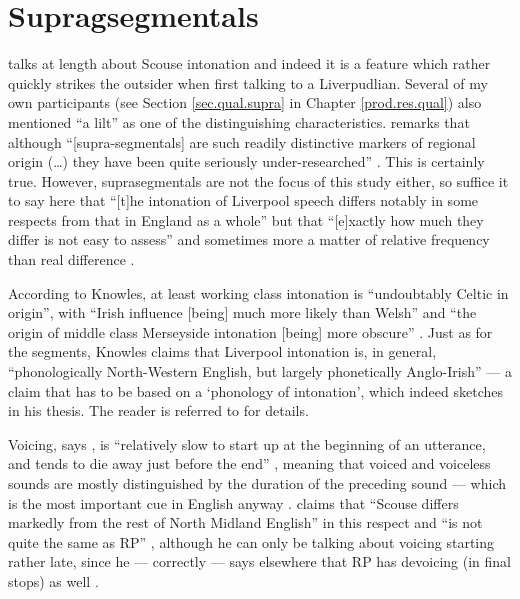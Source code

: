 	\section{Supragsegmentals}\label{sec.var.supra}

\citet{knowles1973} talks at length about Scouse intonation and indeed it is a feature which rather quickly strikes the outsider when first talking to a Liverpudlian.
Several of my own participants (see Section \ref{sec.qual.supra} in Chapter \ref{prod.res.qual}) also mentioned ``a lilt'' as one of the distinguishing characteristics.
\citeauthor{wales2006} remarks that although ``[supra-segmentals] are such readily distinctive markers of regional origin (\ldots) they have been quite seriously under-researched'' \citeyearpar[201]{wales2006}.
This is certainly true.
However, suprasegmentals are not the focus of this study either, so suffice it to say here that ``[t]he intonation of Liverpool speech differs notably in some respects from that in England as a whole'' but that ``[e]xactly how much they differ is not easy to assess'' \citep[221]{knowles1973} and sometimes more a matter of relative frequency than real difference \citep[cf.][176]{knowles1973}.

According to Knowles, at least working class intonation is ``undoubtably Celtic in origin'', with ``Irish influence [being] much more likely than Welsh'' \citep[221--222]{knowles1973} and ``the origin of middle class Merseyside intonation [being] more obscure'' \citep[222--223]{knowles1973}.
Just as for the segments, Knowles claims that Liverpool intonation is, in general, ``phonologically North-Western English, but largely phonetically Anglo-Irish'' \citep[225]{knowles1973} --- a claim that has to be based on a `phonology of intonation', which indeed \citeauthor{knowles1973} sketches in his thesis.
The reader is referred to \citet[174--226]{knowles1973} for details.

Voicing, says \citeauthor{knowles1973}, is ``relatively slow to start up at the beginning of an utterance, and tends to die away just before the end'' \citeyearpar[246]{knowles1973}, meaning that voiced and voiceless sounds are mostly distinguished by the duration of the preceding sound --- which is the most important cue in English anyway \citep[cf., for instance,][]{hoganrozsypal1980}. \citeauthor{knowles1973} claims that ``Scouse differs markedly from the rest of North Midland English'' in this respect and ``is not quite the same as RP'' \citeyearpar[246]{knowles1973}, although he can only be talking about voicing starting rather late, since he --- correctly --- says elsewhere that RP has devoicing (in final stops) as well \citeyearpar[cf.][114]{knowles1973}.

